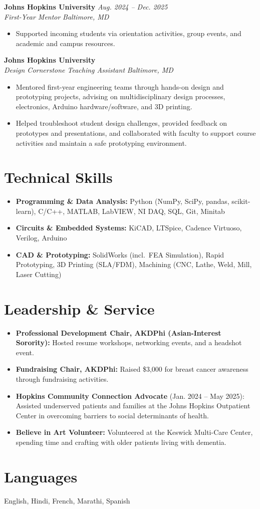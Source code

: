 \documentclass[10.5pt,letterpaper]{article}
\newcommand{\tightlist}{\vspace{-9pt}}
\newcommand{\jobhead}[4]{%
  \noindent\textbf{#1} \hfill \textit{#2}\\
  \noindent\textit{#3} \hfill \textit{#4}\\[-0.15em]
}
\begin{document}
\jobhead{Johns Hopkins University}{Aug. 2024 -- Dec. 2025}{First-Year Mentor}{Baltimore, MD}
\tightlist
\begin{itemize}
  \item Supported incoming students via orientation activities, group events, and academic and campus resources.
\end{itemize}

\jobhead{Johns Hopkins University}{}{Design Cornerstone Teaching Assistant}{Baltimore, MD}
\tightlist
\begin{itemize}
  \item Mentored first-year engineering teams through hands-on design and prototyping projects, advising on multidisciplinary design processes, electronics, Arduino hardware/software, and 3D printing.
  \item Helped troubleshoot student design challenges, provided feedback on prototypes and presentations, and collaborated with faculty to support course activities and maintain a safe prototyping environment.
\end{itemize}

\section{Technical Skills}
\begin{itemize}
  \item \textbf{Programming \& Data Analysis:} Python (NumPy, SciPy, pandas, scikit-learn), C/C++, MATLAB, LabVIEW, NI DAQ, SQL, Git, Minitab
  \item \textbf{Circuits \& Embedded Systems:} KiCAD, LTSpice, Cadence Virtuoso, Verilog, Arduino
  \item \textbf{CAD \& Prototyping:} SolidWorks (incl.\ FEA Simulation), Rapid Prototyping, 3D Printing (SLA/FDM), Machining (CNC, Lathe, Weld, Mill, Laser Cutting)
\end{itemize}

\section{Leadership \& Service}
\begin{itemize}
  \item \textbf{Professional Development Chair, AKDPhi (Asian-Interest Sorority):} Hosted resume workshops, networking events, and a headshot event.
  \item \textbf{Fundraising Chair, AKDPhi:} Raised \$3{,}000 for breast cancer awareness through fundraising activities.
  \item \textbf{Hopkins Community Connection Advocate} (Jan. 2024 -- May 2025): Assisted underserved patients and families at the Johns Hopkins Outpatient Center in overcoming barriers to social determinants of health.
  \item \textbf{Believe in Art Volunteer:} Volunteered at the Keswick Multi-Care Center, spending time and crafting with older patients living with dementia.
\end{itemize}

\section{Languages}
English, Hindi, French, Marathi, Spanish
\end{document}
